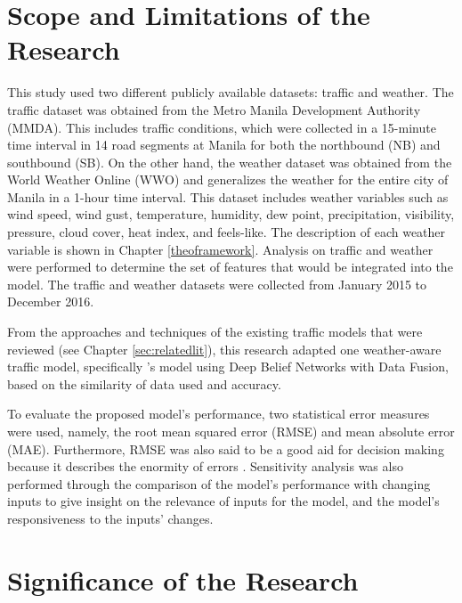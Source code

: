 \section{Scope and Limitations of the Research}
\label{sec:scopelimitations}

This study used two different publicly available datasets: traffic and weather. The traffic dataset was obtained from the Metro Manila Development Authority (MMDA). This includes traffic conditions, which were collected in a 15-minute time interval in 14 road segments at Manila for both the northbound (NB) and southbound (SB). On the other hand, the weather dataset was obtained from the World Weather Online (WWO) and generalizes the weather for the entire city of Manila in a 1-hour time interval. This dataset includes weather variables such as wind speed, wind gust, temperature, humidity, dew point, precipitation, visibility, pressure, cloud cover, heat index, and feels-like. The description of each weather variable is shown in Chapter \ref{theoframework}. Analysis on traffic and weather were performed to determine the set of features that would be integrated into the model. The traffic and weather datasets were collected from January 2015 to December 2016.

From the approaches and techniques of the existing traffic models that were reviewed (see Chapter \ref{sec:relatedlit}), this research adapted one weather-aware traffic model, specifically ’s model using Deep Belief Networks with Data Fusion, based on the similarity of data used and accuracy. 

To evaluate the proposed model’s performance, two statistical error measures were used, namely, the root mean squared error (RMSE) and mean absolute error (MAE). Furthermore, RMSE was also said to be a good aid for decision making because it describes the enormity of errors . Sensitivity analysis was also performed through the comparison of the model’s performance with changing inputs to give insight on the relevance of inputs for the model, and the model’s responsiveness to the inputs’ changes. 





\section{Significance of the Research}
\label{sec:significance}

